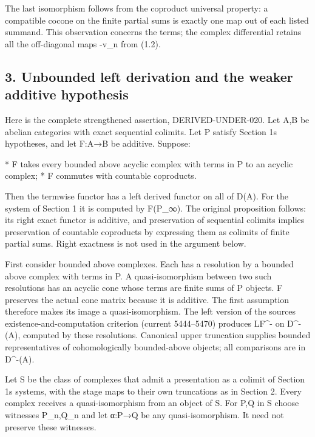 The last isomorphism follows from the coproduct universal property:\allowbreak{} a compatible cocone on the finite partial sums is exactly one map out of each listed summand. This observation concerns the terms; the complex differential retains all the off-diagonal maps -v\_\allowbreak{}n from (1.2)\allowbreak{}.

\subsection{3. Unbounded left derivation and the weaker additive hypothesis}\label{proofs-9206-9744-unbounded-left-derivation-and-the-weaker-additive-hypothesis}

Here is the complete strengthened assertion,\allowbreak{} DERIVED-UNDER-020. Let A,\allowbreak{}B be abelian categories with exact sequential colimits. Let P satisfy Section 1\textquotesingle s hypotheses,\allowbreak{} and let F:\allowbreak{}A\allowbreak{}→B be additive. Suppose:\allowbreak{}

* F takes every bounded above acyclic complex with terms in P to an acyclic complex; * F commutes with countable coproducts.

Then the termwise functor has a left derived functor on all of D(A)\allowbreak{}. For the system of Section 1 it is computed by F(P\_\allowbreak{}∞)\allowbreak{}. The original proposition follows:\allowbreak{} its right exact functor is additive,\allowbreak{} and preservation of sequential colimits implies preservation of countable coproducts by expressing them as colimits of finite partial sums. Right exactness is not used in the argument below.

First consider bounded above complexes. Each has a resolution by a bounded above complex with terms in P. A quasi-isomorphism between two such resolutions has an acyclic cone whose terms are finite sums of P objects. F preserves the actual cone matrix because it is additive. The first assumption therefore makes its image a quasi-isomorphism. The left version of the source\textquotesingle s existence-and-computation criterion (current 5444–\allowbreak{}5470)\allowbreak{} produces LF\^{}- on D\textasciicircum{}-(A)\allowbreak{},\allowbreak{} computed by these resolutions. Canonical upper truncation supplies bounded representatives of cohomologically bounded-above objects; all comparisons are in D\textasciicircum{}-(A)\allowbreak{}.

Let S be the class of complexes that admit a presentation as a colimit of Section 1\textquotesingle s systems,\allowbreak{} with the stage maps to their own truncations as in Section 2. Every complex receives a quasi-isomorphism from an object of S. For P,\allowbreak{}Q in S choose witnesses P\_\allowbreak{}n,\allowbreak{}Q\_\allowbreak{}n and let α:\allowbreak{}P\allowbreak{}→Q be any quasi-isomorphism. It need not preserve these witnesses.

